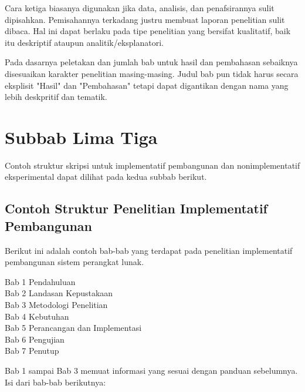 Cara ketiga biasanya digunakan jika data, analisis, dan penafsirannya sulit dipisahkan. Pemisahannya terkadang justru membuat laporan penelitian sulit dibaca. Hal ini dapat berlaku pada tipe penelitian yang bersifat kualitatif, baik itu deskriptif ataupun analitik/eksplanatori. 

Pada dasarnya peletakan dan jumlah bab untuk hasil dan pembahasan sebaiknya disesuaikan karakter penelitian masing-masing. Judul bab pun tidak harus secara eksplisit "Hasil" dan "Pembahasan" tetapi dapat digantikan dengan nama yang lebih deskpritif dan tematik. 

\section{Subbab Lima Tiga}

Contoh struktur skripsi untuk implementatif pembangunan dan nonimplementatif eksperimental dapat dilihat pada kedua subbab berikut. 

\subsection{Contoh Struktur Penelitian Implementatif Pembangunan}

Berikut ini adalah contoh bab-bab yang terdapat pada penelitian implementatif pembangunan sistem perangkat lunak. 
\begin{displayquote}
  Bab 1 Pendahuluan \\
  Bab 2 Landasan Kepustakaan \\
  Bab 3 Metodologi Penelitian \\
  Bab 4 Kebutuhan \\
  Bab 5 Perancangan dan Implementasi \\
  Bab 6 Pengujian \\
  Bab 7 Penutup
\end{displayquote}
Bab 1 sampai Bab 3 memuat informasi yang sesuai dengan panduan sebelumnya. Isi dari bab-bab berikutnya: 


